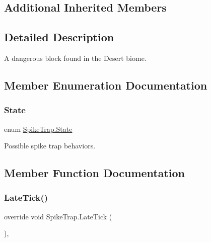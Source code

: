 \subsection*{Additional Inherited Members}


\subsection{Detailed Description}
A dangerous block found in the Desert biome. 



\subsection{Member Enumeration Documentation}
\mbox{\label{class_spike_trap_aef68a8a783dac108341ca190a4dc0f81}} 
\subsubsection{\texorpdfstring{State}{State}}
{\footnotesize\ttfamily enum \mbox{\hyperlink{class_spike_trap_aef68a8a783dac108341ca190a4dc0f81}{Spike\+Trap.\+State}}\hspace{0.3cm}{\ttfamily [strong]}}



Possible spike trap behaviors. 



\subsection{Member Function Documentation}
\mbox{\label{class_spike_trap_acedae588051f3999c6c364ae031c9814}} 
\subsubsection{\texorpdfstring{Late\+Tick()}{LateTick()}}
{\footnotesize\ttfamily override void Spike\+Trap.\+Late\+Tick (\begin{DoxyParamCaption}{ }\end{DoxyParamCaption})\hspace{0.3cm}{\ttfamily [inline]}, {\ttfamily [virtual]}}



